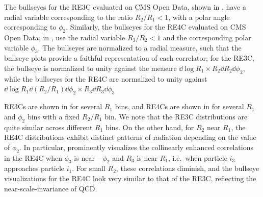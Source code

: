 The bullseyes for the RE3C evaluated on CMS Open Data, shown in , have a radial variable corresponding to the ratio \(R_2/R_1 < 1\), with a polar angle corresponding to \(\phi_2\).
%
Similarly, the bullseyes for the RE4C evaluated on CMS Open Data, in , use the radial variable \(R_3/R_2 < 1\) and the corresponding polar variable \(\phi_3\).
%
The bullseyes are normalized to a radial measure, such that the bullseye plots provide a faithful representation of each correlator;
%
for the RE3C, the bullseye is normalized to unity against the measure \(\dd\log R_1 \times R_2 \dd R_2 \dd \phi_2\), while the bullseyes for the RE4C are normalized to unity against \(\dd \log R_1 \dd (R_2/R_1) \dd \phi_2  \times R_3 \dd R_3 \dd \phi_3\)

RE3Cs are shown in  for several \(R_1\) bins, and RE4Cs are shown in  for several \(R_1\) and \(\phi_2\) bins with a fixed \(R_2/R_1\) bin.
%
We note that the RE3C distributions are quite similar across different \(R_1\) bins.
%
On the other hand, for \(R_2\) near \(R_1\), the RE4C distributions exhibit distinct patterns of radiation depending on the value of \(\phi_2\).
%
In particular,  prominently visualizes the collinearly enhanced correlations in the RE4C when \(\phi_3\) is near \(-\phi_2\) and \(R_3\) is near \(R_1\), i.e.~when particle \(i_3\) approaches particle \(i_1\).
%
For small \(R_2\), these correlations diminish, and the bullseye visualizations for the RE4C look very similar to that of the RE3C, reflecting the near-scale-invariance of QCD.

\vspace{20pt}

